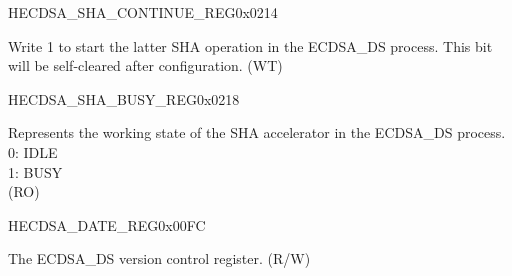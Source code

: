 \begin{register}{H}{ECDSA\_SHA\_CONTINUE\_REG}{0x0214}\label{regdesc:ECDSASHACONTINUEREG}
%
%
\regnewline%
\begin{regdesc}\begin{reglist}
\label{fielddesc:ECDSASHACONTINUE}\item [ECDSA\_SHA\_CONTINUE] Write 1 to start the latter SHA operation in the ECDSA\_DS process. This bit will be self-cleared after configuration. (WT)
\end{reglist}\end{regdesc}
\end{register}


\begin{register}{H}{ECDSA\_SHA\_BUSY\_REG}{0x0218}\label{regdesc:ECDSASHABUSYREG}
%
%
\regnewline%
\begin{regdesc}\begin{reglist}
\label{fielddesc:ECDSASHABUSY}\item [ECDSA\_SHA\_BUSY] Represents the working state of the SHA accelerator in the ECDSA\_DS process.\\
0: IDLE\\
1: BUSY\\
(RO)
\end{reglist}\end{regdesc}
\end{register}


\begin{register}{H}{ECDSA\_DATE\_REG}{0x00FC}\label{regdesc:ECDSADATEREG}
%
%
\regnewline%
\begin{regdesc}\begin{reglist}
\label{fielddesc:ECDSADATE}\item [ECDSA\_DATE] The ECDSA\_DS version control register. (R/W)
\end{reglist}\end{regdesc}
\end{register}
